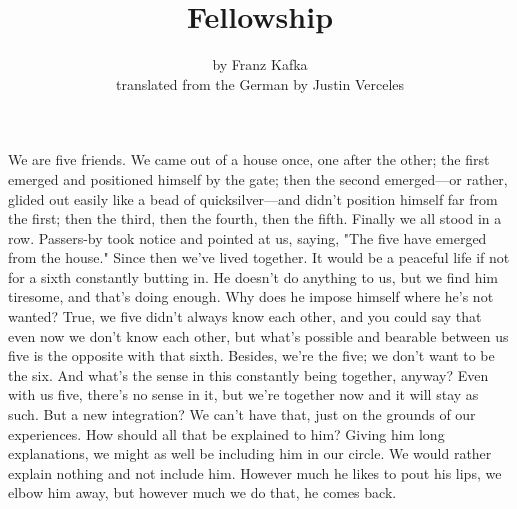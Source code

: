 \documentclass[12pt,a4paper]{article}
\title{Fellowship}
\author{by Franz Kafka\\translated from the German by Justin Verceles}
\date{}
\begin{document}
\maketitle
We are five friends. We came out of a house once, one after the other; the first emerged and positioned himself by the gate; then the second emerged—or rather, glided out easily like a bead of quicksilver—and didn’t position himself far from the first; then the third, then the fourth, then the fifth. Finally we all stood in a row. Passers-by took notice and pointed at us, saying, "The five have emerged from the house." Since then we’ve lived together. It would be a peaceful life if not for a sixth constantly butting in. He doesn’t do anything to us, but we find him tiresome, and that’s doing enough. Why does he impose himself where he’s not wanted? True, we five didn’t always know each other, and you could say that even now we don’t know each other, but what’s possible and bearable between us five is the opposite with that sixth. Besides, we’re the five; we don’t want to be the six. And what’s the sense in this constantly being together, anyway? Even with us five, there’s no sense in it, but we’re together now and it will stay as such. But a new integration? We can’t have that, just on the grounds of our experiences. How should all that be explained to him? Giving him long explanations, we might as well be including him in our circle. We would rather explain nothing and not include him. However much he likes to pout his lips, we elbow him away, but however much we do that, he comes back. 
\end{document}
